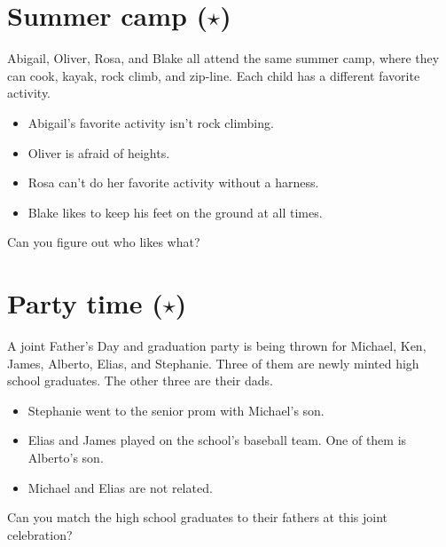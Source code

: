 \documentclass[11pt]{article}
\begin{document}
\section{Summer camp ($\star$)}
\noindent Abigail, Oliver, Rosa, and Blake all attend the same summer camp,
where they can cook, kayak, rock climb, and zip-line. Each child has a different
favorite activity.
\begin{itemize}
  \item Abigail’s favorite activity isn’t rock climbing.
  \item Oliver is afraid of heights.
  \item Rosa can’t do her favorite activity without a harness.
  \item Blake likes to keep his feet on the ground at all times.
\end{itemize}
Can you figure out who likes what?

\section{Party time ($\star$)}
\noindent A joint Father’s Day and graduation party is being thrown for Michael,
Ken, James, Alberto, Elias, and Stephanie. Three of them are newly minted high
school graduates. The other three are their dads.
\begin{itemize}
  \item Stephanie went to the senior prom with Michael’s son.
  \item Elias and James played on the school’s baseball team. One of them is Alberto’s son.
  \item Michael and Elias are not related.
\end{itemize}
Can you match the high school graduates to their fathers at this joint celebration?
\end{document}
